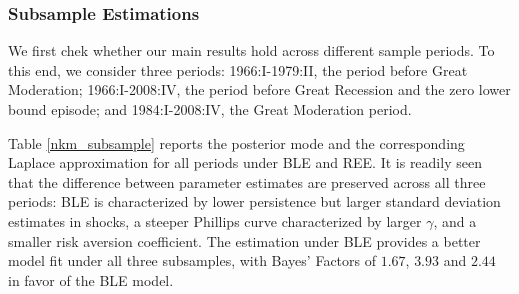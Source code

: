 












\subsubsection*{Subsample Estimations}

We first chek whether our main results hold across different sample periods. To this end, we consider three periods: 1966:I-1979:II, the period before Great Moderation; 1966:I-2008:IV, the period before Great Recession and the zero lower bound episode; and 1984:I-2008:IV, the Great Moderation period. 

\noindent

Table \ref{nkm_subsample} reports the posterior mode and the corresponding Laplace approximation for all periods under BLE and REE. It is readily seen that the difference between parameter estimates are preserved across all three periods: BLE is characterized by lower persistence but larger standard deviation estimates in shocks, a steeper Phillips curve characterized by larger $\gamma$, and a smaller risk aversion coefficient. The estimation under BLE provides a better model fit under all three subsamples, with Bayes' Factors of $1.67$, $3.93$ and $2.44$ in favor of the BLE model. 




